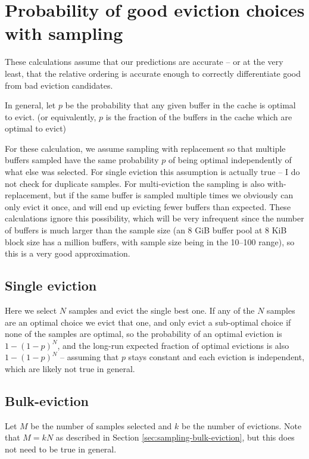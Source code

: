 
\chapter{Probability of good eviction choices with sampling\label{sec:sampling-probabilities}}

These calculations assume that our predictions are accurate -- or at the very least, that the relative ordering is accurate enough to correctly differentiate good from bad eviction candidates.

In general, let $p$ be the probability that any given buffer in the cache is optimal to evict. (or equivalently, $p$ is the fraction of the buffers in the cache which are optimal to evict)

For these calculation, we assume sampling with replacement so that multiple buffers sampled have the same probability $p$ of being optimal independently of what else was selected. For single eviction this assumption is actually true -- I do not check for duplicate samples. For multi-eviction the sampling is also with-replacement, but if the same buffer is sampled multiple times we obviously can only evict it once, and will end up evicting fewer buffers than expected. These calculations ignore this possibility, which will be very infrequent since the number of buffers is much larger than the sample size (an 8 GiB buffer pool at 8 KiB block size has a million buffers, with sample size being in the 10--100 range), so this is a very good approximation.


\section{Single eviction}

Here we select $N$ samples and evict the single best one. If any of the $N$ samples are an optimal choice we evict that one, and only evict a sub-optimal choice if none of the samples are optimal, so the probability of an optimal eviction is $1-(1-p)^N$, and the long-run expected fraction of optimal evictions is also $1-(1-p)^N$ -- assuming that $p$ stays constant and each eviction is independent, which are likely not true in general.


\section{Bulk-eviction}

Let $M$ be the number of samples selected and $k$ be the number of evictions. Note that $M=kN$ as described in Section \ref{sec:sampling-bulk-eviction}, but this does not need to be true in general.

